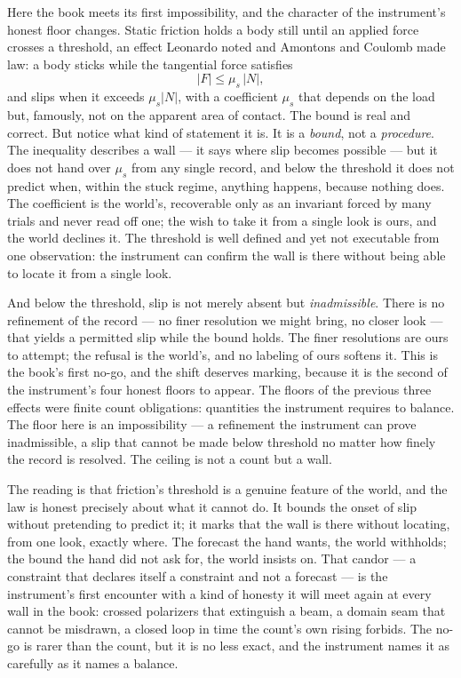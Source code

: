 Here the book meets its first impossibility, and the character of the instrument's honest floor changes.
Static friction holds a body still until an applied force crosses a threshold, an effect Leonardo noted and
Amontons and Coulomb made law: a body sticks while the tangential force satisfies
\begin{equation}
  |F| \le \mu_s\, |N|,
\end{equation}
and slips when it exceeds $\mu_s |N|$, with a coefficient $\mu_s$ that depends on the load but, famously, not
on the apparent area of contact. The bound is real and correct. But notice what kind of statement it is. It is
a \emph{bound}, not a \emph{procedure}. The inequality describes a wall --- it says where slip becomes
possible --- but it does not hand over $\mu_s$ from any single record, and below the threshold it does not
predict when, within the stuck regime, anything happens, because nothing does. The coefficient is the world's,
recoverable only as an invariant forced by many trials and never read off one; the wish to take it from a
single look is ours, and the world declines it. The threshold is well defined and yet not executable from one
observation: the instrument can confirm the wall is there without being able to locate it from a single look.

And below the threshold, slip is not merely absent but \emph{inadmissible}. There is no refinement of the
record --- no finer resolution we might bring, no closer look --- that yields a permitted slip while the bound
holds. The finer resolutions are ours to attempt; the refusal is the world's, and no labeling of ours softens
it. This is the book's first no-go, and the shift deserves marking, because it is the second of the
instrument's four honest floors to appear. The floors of the previous three effects were finite count obligations:
quantities the instrument requires to balance. The floor here is an impossibility --- a refinement the
instrument can prove inadmissible, a slip that cannot be made below threshold no matter how finely the record
is resolved. The ceiling is not a count but a wall.

The reading is that friction's threshold is a genuine feature of the world, and the law is honest precisely
about what it cannot do. It bounds the onset of slip without pretending to predict it; it marks that the wall
is there without locating, from one look, exactly where. The forecast the hand wants, the world withholds; the
bound the hand did not ask for, the world insists on. That candor --- a constraint that declares itself a
constraint and not a forecast --- is the instrument's first encounter with a kind of honesty it will meet
again at every wall in the book: crossed polarizers that extinguish a beam, a domain seam that cannot be
misdrawn, a closed loop in time the count's own rising forbids. The no-go is rarer than the count, but it is
no less exact, and the instrument names it as carefully as it names a balance.

